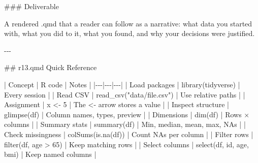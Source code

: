 \documentclass[
  letterpaper,
  DIV=11,
  numbers=noendperiod,
  oneside]{scrreprt}
\newenvironment{Shaded}{\begin{snugshade}}{\end{snugshade}}
\newcommand{\FunctionTok}[1]{\textcolor[rgb]{0.28,0.35,0.67}{#1}}
\newcommand{\InformationTok}[1]{\textcolor[rgb]{0.37,0.37,0.37}{#1}}
\newcommand{\NormalTok}[1]{\textcolor[rgb]{0.00,0.23,0.31}{#1}}
\newcommand{\PreprocessorTok}[1]{\textcolor[rgb]{0.68,0.00,0.00}{#1}}
\begin{document}
\begin{Shaded}
\begin{Highlighting}[numbers=left,,]
\FunctionTok{\#\#\# Deliverable}

\NormalTok{A rendered }\InformationTok{\textasciigrave{}.qmd\textasciigrave{}}\NormalTok{ that a reader can follow as a narrative: what data you started with, what you did to it, what you found, and why your decisions were justified.}

\NormalTok{{-}{-}{-}}

\FunctionTok{\#\# \textasciigrave{}r13.qmd\textasciigrave{} Quick Reference}

\PreprocessorTok{|}\NormalTok{ Concept }\PreprocessorTok{|}\NormalTok{ R code }\PreprocessorTok{|}\NormalTok{ Notes }\PreprocessorTok{|}
\PreprocessorTok{|{-}{-}{-}|{-}{-}{-}|{-}{-}{-}|}
\PreprocessorTok{|}\NormalTok{ Load packages }\PreprocessorTok{|} \InformationTok{\textasciigrave{}library(tidyverse)\textasciigrave{}} \PreprocessorTok{|}\NormalTok{ Every session }\PreprocessorTok{|}
\PreprocessorTok{|}\NormalTok{ Read CSV }\PreprocessorTok{|} \InformationTok{\textasciigrave{}read\_csv("data/file.csv")\textasciigrave{}} \PreprocessorTok{|}\NormalTok{ Use relative paths }\PreprocessorTok{|}
\PreprocessorTok{|}\NormalTok{ Assignment }\PreprocessorTok{|} \InformationTok{\textasciigrave{}x \textless{}{-} 5\textasciigrave{}} \PreprocessorTok{|}\NormalTok{ The }\InformationTok{\textasciigrave{}\textless{}{-}\textasciigrave{}}\NormalTok{ arrow stores a value }\PreprocessorTok{|}
\PreprocessorTok{|}\NormalTok{ Inspect structure }\PreprocessorTok{|} \InformationTok{\textasciigrave{}glimpse(df)\textasciigrave{}} \PreprocessorTok{|}\NormalTok{ Column names, types, preview }\PreprocessorTok{|}
\PreprocessorTok{|}\NormalTok{ Dimensions }\PreprocessorTok{|} \InformationTok{\textasciigrave{}dim(df)\textasciigrave{}} \PreprocessorTok{|}\NormalTok{ Rows × columns }\PreprocessorTok{|}
\PreprocessorTok{|}\NormalTok{ Summary stats }\PreprocessorTok{|} \InformationTok{\textasciigrave{}summary(df)\textasciigrave{}} \PreprocessorTok{|}\NormalTok{ Min, median, mean, max, NAs }\PreprocessorTok{|}
\PreprocessorTok{|}\NormalTok{ Check missingness }\PreprocessorTok{|} \InformationTok{\textasciigrave{}colSums(is.na(df))\textasciigrave{}} \PreprocessorTok{|}\NormalTok{ Count NAs per column }\PreprocessorTok{|}
\PreprocessorTok{|}\NormalTok{ Filter rows }\PreprocessorTok{|} \InformationTok{\textasciigrave{}filter(df, age \textgreater{} 65)\textasciigrave{}} \PreprocessorTok{|}\NormalTok{ Keep matching rows }\PreprocessorTok{|}
\PreprocessorTok{|}\NormalTok{ Select columns }\PreprocessorTok{|} \InformationTok{\textasciigrave{}select(df, id, age, bmi)\textasciigrave{}} \PreprocessorTok{|}\NormalTok{ Keep named columns }\PreprocessorTok{|}

\end{Highlighting}
\end{Shaded}
\end{document}
